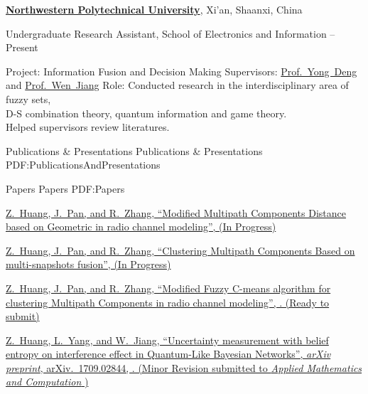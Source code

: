 \documentclass[letterpaper,MMMyyyy,nonstopmode]{simpleresumecv}
\begin{document}
\begin{Body}
\begin{Detail}
\end{Detail}

\Entry
\href{http://en.nwpu.edu.cn/}
{\textbf{Northwestern Polytechnical University}},
Xi'an, Shaanxi, China

\Gap
\BulletItem
Undergraduate Research Assistant, School of Electronics and Information
\hfill
{} --
Present
\begin{Detail}
\SubBulletItem
Project:
Information Fusion and Decision Making
\SubBulletItem
Supervisors:
\href{http://computer.swu.edu.cn/s/computer/szdw2js/20160427/913967.html}
{Prof.~Yong~Deng} and
\href{http://teacher.nwpu.edu.cn/jiangwen.html}
{Prof.~Wen~Jiang}
\SubBulletItem
Role:
Conducted research in the interdisciplinary area of fuzzy sets,\\ D-S combination theory, quantum information and game theory. \\
Helped supervisors review literatures.
\end{Detail}

\Section
{Publications \&\newline
Presentations}
{Publications \& Presentations}
{PDF:PublicationsAndPresentations}

\SubSection
{Papers}
{Papers}
{PDF:Papers}

\begingroup
\renewcommand{\MaxNumberedItem}{[88]}

\Gap
\NumberedItem{[1]}
\href{https://arxiv.org/abs/1709.02844}
{\underline{Z.~Huang}, J.~Pan, and R.~Zhang,
``Modified Multipath Components Distance based on Geometric in radio channel modeling'',
(In Progress)}

\Gap
\NumberedItem{[2]}
\href{https://arxiv.org/abs/1709.02844}
{\underline{Z.~Huang}, J.~Pan, and R.~Zhang,
``Clustering Multipath Components Based on multi-snapshots fusion'',
(In Progress)}

\Gap
\NumberedItem{[3]}
\href{https://arxiv.org/abs/1709.02844}
{\underline{Z.~Huang}, J.~Pan, and R.~Zhang,
``Modified Fuzzy C-means algorithm for clustering Multipath Components in radio channel modeling'',
. (Ready to submit)}

\Gap
\NumberedItem{[4]}
\href{https://arxiv.org/abs/1709.02844}
{\underline{Z.~Huang}, L.~Yang, and W.~Jiang,
``Uncertainty measurement with belief entropy on interference effect in Quantum-Like Bayesian Networks'',
\textit{arXiv preprint},
arXiv.~1709.02844,
. (Minor Revision submitted to \textit{Applied Mathematics and Computation} )}


\end{Body}
\end{document}
